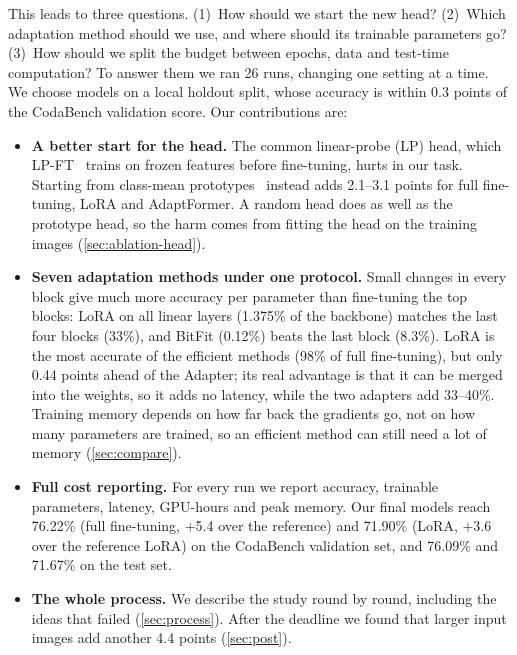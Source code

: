 This leads to three questions.
(1)~How should we start the new head?
(2)~Which adaptation method should we use, and where should its trainable parameters go?
(3)~How should we split the budget between epochs, data and test-time computation?
To answer them we ran 26 runs, changing one setting at a time.
We choose models on a local holdout split, whose accuracy is within 0.3 points of the CodaBench validation score.
Our contributions are:
\begin{itemize}[leftmargin=*,itemsep=1pt,topsep=2pt]
    \item \textbf{A better start for the head.} The common linear-probe (LP) head, which LP-FT~\cite{kumar2022lpft} trains on frozen features before fine-tuning, hurts in our task. Starting from class-mean prototypes~\cite{qi2018imprinted} instead adds 2.1--3.1 points for full fine-tuning, LoRA and AdaptFormer. A random head does as well as the prototype head, so the harm comes from fitting the head on the training images (\cref{sec:ablation-head}).
    \item \textbf{Seven adaptation methods under one protocol.} Small changes in every block give much more accuracy per parameter than fine-tuning the top blocks: LoRA on all linear layers (1.375\% of the backbone) matches the last four blocks (33\%), and BitFit (0.12\%) beats the last block (8.3\%). LoRA is the most accurate of the efficient methods (98\% of full fine-tuning), but only 0.44 points ahead of the Adapter; its real advantage is that it can be merged into the weights, so it adds no latency, while the two adapters add 33--40\%. Training memory depends on how far back the gradients go, not on how many parameters are trained, so an efficient method can still need a lot of memory (\cref{sec:compare}).
    \item \textbf{Full cost reporting.} For every run we report accuracy, trainable parameters, latency, GPU-hours and peak memory. Our final models reach 76.22\% (full fine-tuning, $+$5.4 over the reference) and 71.90\% (LoRA, $+$3.6 over the reference LoRA) on the CodaBench validation set, and 76.09\% and 71.67\% on the test set.
    \item \textbf{The whole process.} We describe the study round by round, including the ideas that failed (\cref{sec:process}). After the deadline we found that larger input images add another 4.4 points (\cref{sec:post}).
\end{itemize}
